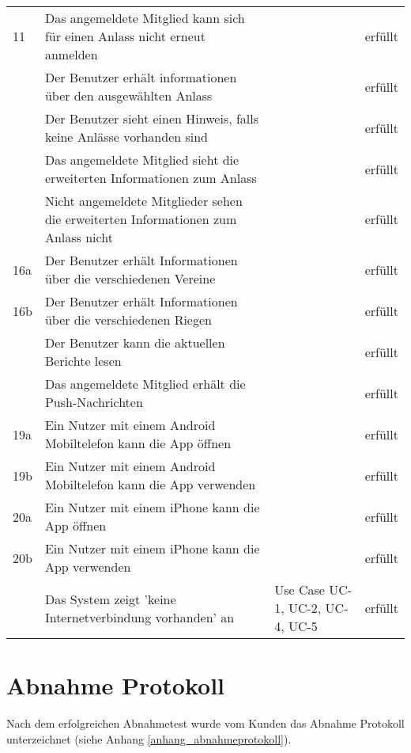 \begin{longtable}{>{\raggedright}m{1cm}m{7cm}m{3cm}m{2cm}}
	11	&	Das angemeldete Mitglied kann sich für einen Anlass nicht erneut anmelden
				&	\nameref{table:req_5} 	&	erfüllt\\ \addlinespace\hline \addlinespace
	12	&	Der Benutzer erhält informationen über den ausgewählten Anlass
				&	\nameref{table:req_6} 	&	erfüllt\\ \addlinespace\hline \addlinespace
	13	&	Der Benutzer sieht einen Hinweis, falls keine Anlässe vorhanden sind
				&	\nameref{table:req_6} 	&	erfüllt\\ \addlinespace\hline \addlinespace
	14	&	Das angemeldete Mitglied sieht die erweiterten Informationen zum Anlass
				&	\nameref{table:req_7} 	&	erfüllt\\ \addlinespace\hline \addlinespace
	15	&	Nicht angemeldete Mitglieder sehen die erweiterten Informationen zum Anlass nicht
				&	\nameref{table:req_7} 	&	erfüllt\\ \addlinespace\hline \addlinespace
	16a	&	Der Benutzer erhält Informationen über die verschiedenen Vereine
				&	\nameref{table:req_8} 	&	erfüllt\\ \addlinespace\hline \addlinespace
	16b	&	Der Benutzer erhält Informationen über die verschiedenen Riegen
				&	\nameref{table:req_8} 	&	erfüllt\\ \addlinespace\hline \addlinespace
	17	&	Der Benutzer kann die aktuellen Berichte lesen
				&	\nameref{table:req_9} 	&	erfüllt\\ \addlinespace\hline \addlinespace
	18	&	Das angemeldete Mitglied erhält die Push-Nachrichten
				&	\nameref{table:req_10} 	&	erfüllt\\ \addlinespace\hline \addlinespace
	19a	&	Ein Nutzer mit einem Android Mobiltelefon kann die App öffnen
				&	\nameref{table:req_nf_1} 	&	erfüllt\\ \addlinespace\hline \addlinespace
	19b	&	Ein Nutzer mit einem Android Mobiltelefon kann die App verwenden
				&	\nameref{table:req_nf_1} 	&	erfüllt\\ \addlinespace\hline \addlinespace
	20a	&	Ein Nutzer mit einem iPhone kann die App öffnen
				&	\nameref{table:req_nf_2} 	&	erfüllt\\ \addlinespace\hline \addlinespace
	20b	&	Ein Nutzer mit einem iPhone kann die App verwenden
				&	\nameref{table:req_nf_2} 	&	erfüllt\\ \addlinespace\hline \addlinespace
	21	&	Das System zeigt 'keine Internetverbindung vorhanden' an
				&	Use Case UC-1, UC-2, UC-4, UC-5
										&	erfüllt

\end{longtable}

\section{Abnahme Protokoll}
Nach dem erfolgreichen Abnahmetest wurde vom Kunden das Abnahme Protokoll unterzeichnet (siehe Anhang \ref{anhang_abnahmeprotokoll}).
